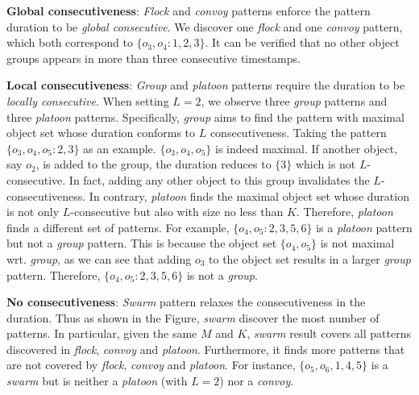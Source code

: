 \noindent\textbf{Global consecutiveness}: \emph{Flock} and \emph{convoy} patterns enforce the pattern duration to be \emph{global consecutive}. We discover one \emph{flock} and one \emph{convoy} pattern, which both correspond to $\{o_3,o_4:1,2,3\}$. It can be verified that no other object groups appears in more than three consecutive timestamps. 

\noindent\textbf{Local consecutiveness}: \emph{Group} and \emph{platoon} patterns require the duration to be \emph{locally consecutive}. When setting $L = 2$,
we observe three \emph{group} patterns and three \emph{platoon} patterns. Specifically, \emph{group} aims to find the
pattern with maximal object set whose duration conforms to $L$ consecutiveness. Taking the pattern $\{o_3,o_4,o_5:2,3\}$ as an example. $\{o_3,o_4,o_5\}$ is indeed maximal. If another object, say $o_2$, is added to the group, the duration reduces to $\{3\}$ which is not $L$-consecutive. In fact, adding any other object to this group invalidates the $L$-consecutiveness. In contrary, \emph{platoon} finds the maximal object set whose duration is not only $L$-consecutive but also with size no less than $K$. Therefore, \emph{platoon} finds a different set of patterns. For example, $\{o_4,o_5:2,3,5,6\}$ is a \emph{platoon} pattern but not a \emph{group} pattern. This is because the object set $\{o_4,o_5\}$ is not maximal wrt. \emph{group}, as we can see that adding $o_3$ to the object set results in a larger \emph{group} pattern. Therefore, $\{o_4,o_5:2,3,5,6\}$ is not a \emph{group}.

\noindent\textbf{No consecutiveness}: \emph{Swarm} pattern relaxes the consecutiveness in the duration. Thus as shown in the Figure, \emph{swarm} discover the most number of patterns. In particular, given the same $M$ and $K$, \emph{swarm} result covers all patterns discovered in \emph{flock}, \emph{convoy} and \emph{platoon}. Furthermore, it finds more patterns that are not covered by \emph{flock}, \emph{convoy} and \emph{platoon}. For instance, $\{o_5,o_6, 1,4,5\}$ is a \emph{swarm} but is neither a \emph{platoon} (with $L=2$) nor a \emph{convoy}.





